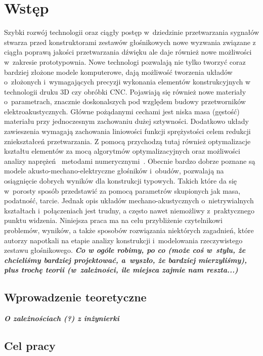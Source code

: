 \documentclass[12pt]{oska}
\affiliation{Akademia Górniczo-Hutnicza im. S. Staszica w Krakowie}
\newcommand{\comment}[1]{{\color{magenta}\emph{\textbf{#1}}}}
\begin{document}
\maketitles

\section{Wstęp}

Szybki rozwój technologii oraz ciągły postęp w~dziedzinie przetwarzania sygnałów stwarza przed konstruktorami zestawów głośnikowych nowe wyzwania związane z ciągła poprawą jakości przetwarzania dźwięku ale daje również nowe możliwości w~zakresie prototypownia. Nowe technologi pozwalają nie tylko tworzyć coraz bardziej złożone modele komputerowe, dają możliwość tworzenia układów o~złożonych i~wymagających precyzji wykonania elementów konstrukcyjnych w technologii druku 3D czy obróbki CNC. Pojawiają się również nowe materiały o~parametrach, znacznie doskonalszych pod względem budowy przetworników elektroakustycznych. Główne pożądanymi cechami jest niska masa (gęstość) materiału przy jednoczesnym zachowaniu dużej sztywności. Dodatkowo układy zawieszenia wymagają zachowania liniowości funkcji sprężystości celem redukcji zniekształceń przetwarzania. Z pomocą przychodzą tutaj również optymalizacje kształtu elementów za mocą algorytmów optymalizacyjnych oraz możliwości analizy naprężeń ~metodami numerycznymi~\cite{naprezenia}. Obecnie bardzo dobrze poznane są modele akusto-mechano-elektryczne głośników i~obudów, pozwalają na osiągnięcie dobrych wyników dla konstrukcji typowych. Takich które da się w~porosty sposób przedstawić za pomocą parametrów skupionych jak masa, podatność, tarcie. Jednak opis układów mechano-akustycznych o~nietrywialnych kształtach i~połączeniach jest trudny, a często nawet niemożliwy z~praktycznego punktu widzenia. Niniejsza praca ma na celu przybliżenie czytelnikowi problemów, wyników, a także sposobów rozwiązania niektórych zagadnień, które autorzy napotkali na etapie analizy konstrukcji i~modelowania rzeczywistego zestawu głośnikowego. \comment{Co w ogóle robimy, po co (może coś w~stylu, że chcieliśmy bardziej projektować, a~wyszło, że bardziej mierzyliśmy), plus trochę teorii (w~zależności, ile miejsca zajmie nam reszta...)}
	
	\subsection{Wprowadzenie teoretyczne}
	
	\comment{O zależnościach (?) z inżynierki}
	
	\subsection{Cel pracy}
	
\end{document}
